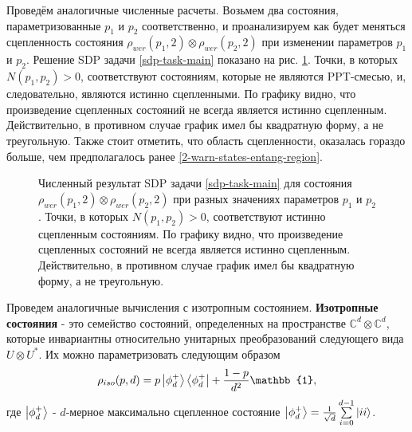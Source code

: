 Проведём аналогичные численные расчеты. Возьмем два состояния, параметризованные $p_1$ и $p_2$ соответственно, и проанализируем как будет меняться сцепленность состояния $\rho_{wer}(p_1,2) \otimes \rho_{wer}(p_2,2)$ при изменении параметров $p_1$ и $p_2$. Решение SDP задачи \ref{sdp-task-main} показано на рис. \ref{ris:sdp-2-warn-states}. Точки, в которых $N(p_1, p_2) > 0$, соответствуют состояниям, которые не являются PPT-смесью, и, следовательно, являются истинно сцепленными. По графику видно, что произведение сцепленных состояний не всегда является истинно сцепленным. Действительно, в противном случае график имел бы квадратную форму, а не треугольную. Также стоит отметить, что область сцепленности, оказалась гораздо больше, чем предполагалось ранее \ref{2-warn-states-entang-region}.

\begin{figure}[h]
    \caption{
    Численный результат SDP задачи \ref{sdp-task-main} для 
    состояния $\rho_{wer}(p_1,2) \otimes \rho_{wer}(p_2,2)$ при разных значениях параметров $p_1$ и $p_2$. Точки, в которых $N(p_1, p_2) > 0$, соответствуют истинно сцепленным состояниям. По графику видно, что произведение сцепленных состояний не всегда является истинно сцепленным. Действительно, в противном случае график имел бы квадратную форму, а не треугольную.
    }
    \label{ris:sdp-2-warn-states}
\end{figure}

Проведем аналогичные вычисления с изотропным состоянием. \textbf{Изотропные состояния} - это семейство состояний, определенных на пространстве $\mathbb{C}^{d} \otimes \mathbb{C}^{d}$, которые инвариантны относительно унитарных преобразований следующего вида $U \otimes U^{*}$. Их можно параметризовать следующим образом
\begin{equation}\label{isotropic-state}
    \rho_{iso}(p, d) = p \ket{\phi^{+}_d}\bra{\phi^{+}_d} + \frac{1-p}{d^2}\mathbb{1},
\end{equation}
где $\ket{\phi^{+}_d}$ - $d$-мерное максимально сцепленное состояние $\ket{\phi^{+}_d} = \frac{1}{\sqrt{d}}\sum\limits_{i=0}^{d-1}\ket{ii}$.

